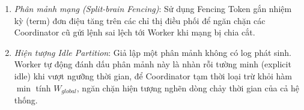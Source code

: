 \documentclass[12pt,a4paper]{article}
\begin{document}
\begin{enumerate}
        \item \textit{Phân mảnh mạng (Split-brain Fencing)}: Sử dụng Fencing Token gắn nhiệm kỳ (term) đơn điệu tăng trên các chỉ thị điều phối để ngăn chặn các Coordinator cũ gửi lệnh sai lệch tới Worker khi mạng bị chia cắt.
        \item \textit{Hiện tượng Idle Partition}: Giả lập một phân mảnh không có log phát sinh. Worker tự động đánh dấu phân mảnh này là nhàn rỗi tường minh (explicit idle) khi vượt ngưỡng thời gian, để Coordinator tạm thời loại trừ khỏi hàm $\min$ tính $W_{global}$, ngăn chặn hiện tượng nghẽn dòng chảy thời gian của cả hệ thống.
    \end{enumerate}

\vspace{0.5cm}

\end{document}
